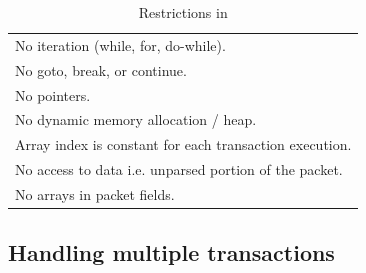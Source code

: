 \begin{table}
  \begin{tabular}{p{}}
    No iteration (while, for, do-while).\\
    No goto, break, or continue.\\
    No pointers.\\
    No dynamic memory allocation / heap.\\
    Array index is constant for each transaction execution.\\
    No access to data i.e. unparsed portion of the packet.\\
    No arrays in packet fields.\\
  \end{tabular}
  \caption{Restrictions in \pktlanguage}
  \label{tab:restrict}
\end{table}

\subsection{Handling multiple transactions}
\label{ss:multiple}

